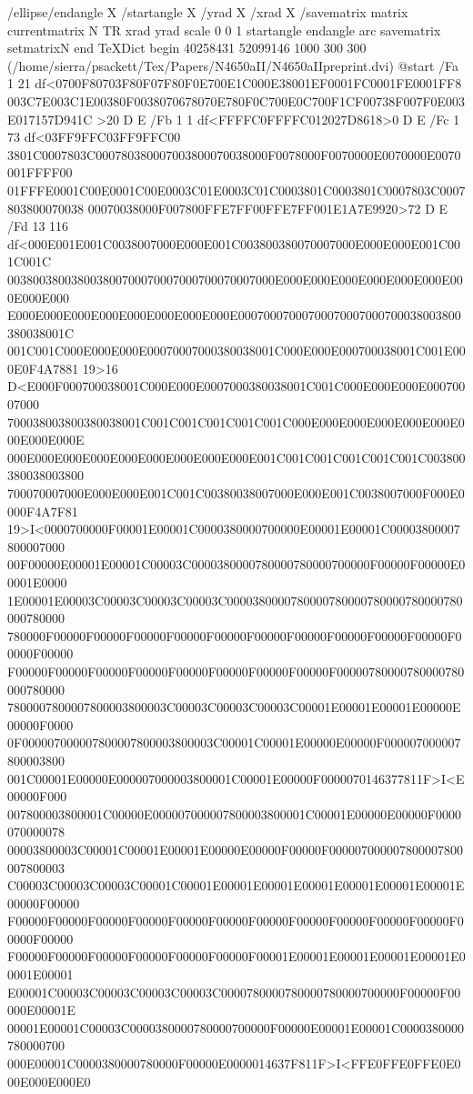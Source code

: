 /ellipse{/endangle X /startangle X /yrad X /xrad X /savematrix matrix
currentmatrix N TR xrad yrad scale 0 0 1 startangle endangle arc savematrix
setmatrix}N end
TeXDict begin 40258431 52099146 1000 300 300
(/home/sierra/psackett/Tex/Papers/N4650aII/N4650aIIpreprint.dvi)
@start /Fa 1 21 df<0700F80703F80F07F80F0E700E1C000E38001EF0001FC0001FE0001FF8
003C7E003C1E00380F0038070678070E780F0C700E0C700F1CF00738F007F0E003E017157D941C
>20 D E /Fb 1 1 df<FFFFC0FFFFC012027D8618>0 D E /Fc 1 73 df<03FF9FFC03FF9FFC00
3801C0007803C000780380007003800070038000F0078000F0070000E0070000E0070001FFFF00
01FFFE0001C00E0001C00E0003C01E0003C01C0003801C0003801C0007803C0007803800070038
00070038000F007800FFE7FF00FFE7FF001E1A7E9920>72 D E /Fd 13
116 df<000E001E001C0038007000E000E001C003800380070007000E000E000E001C001C001C
003800380038003800700070007000700070007000E000E000E000E000E000E000E000E000E000
E000E000E000E000E000E000E000E000E00070007000700070007000700038003800380038001C
001C001C000E000E000E00070007000380038001C000E000E000700038001C001E000E0F4A7881
19>16 D<E000F000700038001C000E000E0007000380038001C001C000E000E000E00070007000
700038003800380038001C001C001C001C001C001C000E000E000E000E000E000E000E000E000E
000E000E000E000E000E000E000E000E000E001C001C001C001C001C001C003800380038003800
700070007000E000E000E001C001C00380038007000E000E001C0038007000F000E0000F4A7F81
19>I<0000700000F00001E00001C0000380000700000E00001E00001C00003800007800007000
00F00000E00001E00001C00003C0000380000780000780000700000F00000F00000E00001E0000
1E00001E00003C00003C00003C00003C0000380000780000780000780000780000780000780000
780000F00000F00000F00000F00000F00000F00000F00000F00000F00000F00000F00000F00000
F00000F00000F00000F00000F00000F00000F00000F00000F00000780000780000780000780000
7800007800007800003800003C00003C00003C00003C00001E00001E00001E00000E00000F0000
0F000007000007800007800003800003C00001C00001E00000E00000F000007000007800003800
001C00001E00000E000007000003800001C00001E00000F0000070146377811F>I<E00000F000
007800003800001C00000E000007000007800003800001C00001E00000E00000F0000070000078
00003800003C00001C00001E00001E00000E00000F00000F000007000007800007800007800003
C00003C00003C00003C00001C00001E00001E00001E00001E00001E00001E00001E00000F00000
F00000F00000F00000F00000F00000F00000F00000F00000F00000F00000F00000F00000F00000
F00000F00000F00000F00000F00000F00000F00001E00001E00001E00001E00001E00001E00001
E00001C00003C00003C00003C00003C0000780000780000780000700000F00000F00000E00001E
00001E00001C00003C0000380000780000700000F00000E00001E00001C0000380000780000700
000E00001C0000380000780000F00000E0000014637F811F>I<FFE0FFE0FFE0E000E000E000E0
